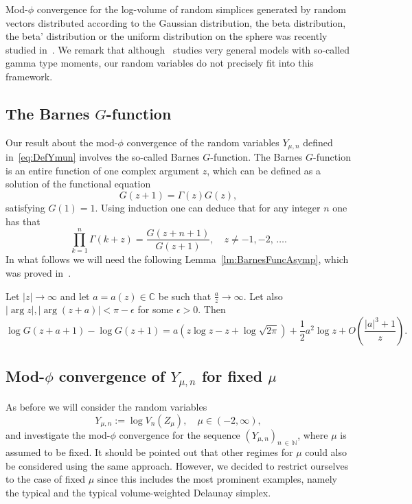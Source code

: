 \documentclass[AHL,Unicode,longabstracts,published]{cedram}
\begin{document}
Mod-$\phi$ convergence for the log-volume of random simplices generated by random vectors distributed according to the Gaussian distribution, the beta distribution, the beta' distribution or the uniform distribution on the sphere was recently studied in~\cite{EKGammaMoments,GKT17}. We remark that although~\cite{EKGammaMoments} studies very general models with so-called gamma type moments, our random variables do not precisely fit into this framework.

\subsection{The Barnes \texorpdfstring{$G$}{G}-function}

Our result about the mod-$\phi$ convergence of the random variables $Y_{\mu,n}$ defined in~\eqref{eq:DefYmun} involves the so-called Barnes $G$-function. The Barnes $G$-function is an entire function of one complex argument $z$, which can be defined as a solution of the functional equation
\[
G(z+1)=\Gamma(z)G(z),
\]
satisfying $G(1)=1$. Using induction one can deduce that for any integer $n$ one has that
\begin{equation}\label{eq:BarnesFunct}
\prod\limits_{k=1}^n\Gamma(k+z)=\frac{G(z+n+1)}{G(z+1)},\quad z\neq -1,-2,\,\ldots.
\end{equation}
In what follows we will need the following Lemma~\ref{lm:BarnesFuncAsymp}, which was proved in~\cite[Lemma~4.1]{GKT17}.

\begin{lemm}\label{lm:BarnesFuncAsymp}
Let $|z|\rightarrow \infty$ and let $a=a(z)\in\mathbb{C}$ be such that $\frac{a}{z}\rightarrow \infty$. Let also $|\arg z|, |\arg (z+a)|<\pi-\epsilon$ for some $\epsilon >0$. Then
\[
\log G(z+a+1)-\log G(z+1)=a\left(z\log z-z+\log\sqrt{2\pi}\right)+\frac{1}{2}a^2\log z+O\left(\frac{|a|^3+1}{z}\right).
\]
\end{lemm}

\subsection{Mod-\texorpdfstring{$\phi$}{phi} convergence of \texorpdfstring{$Y_{\mu,n}$}{Y mu,n} for fixed \texorpdfstring{$\mu$}{mu}}

As before we will consider the random variables
\[
Y_{\mu,n}:=\log V_n(Z_{\mu}),\quad \mu\in(-2,\infty),
\]
and investigate the mod-$\phi$ convergence for the sequence $(Y_{\mu,n})_{n\,\in\,\mathbb{N}}$, where $\mu$ is assumed to be fixed. It should be pointed out that other regimes for $\mu$ could also be considered using the same approach. However, we decided to restrict ourselves to the case of fixed $\mu$ since this includes the most prominent examples, namely the typical and the typical volume-weighted Delaunay simplex.
\end{document}
